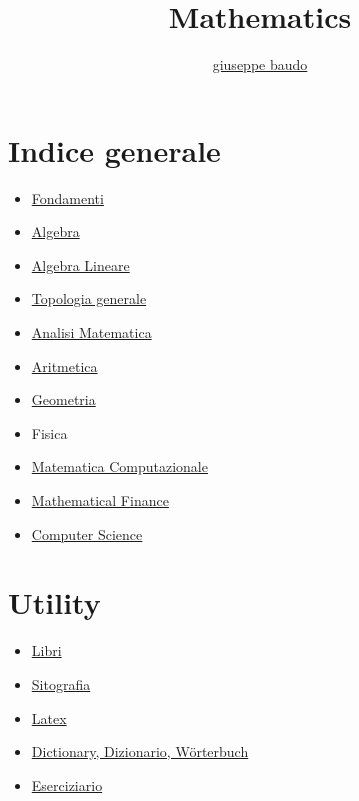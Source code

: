 \documentclass[a4paper,10pt]{article}
\title{Mathematics}
\author{\href{http://www.baudo.hol.es}{giuseppe baudo}}
\begin{document}
\maketitle

\section{Indice generale}
\begin{itemize}
  \item \href{Fondamenti.html}{Fondamenti}
  \item \href{Algebra.html}{Algebra}
  \item \href{AlgebraLineare.html}{Algebra Lineare}
  \item \href{TopologiaGenerale.html}{Topologia generale}
  \item \href{Analisi.html}{Analisi Matematica}
  \item \href{Aritmetica.html}{Aritmetica}  
  \item \href{Geometria.html}{Geometria}
  \item Fisica  
  \item \href{MatematicaComputazionale.html}{Matematica Computazionale}
  \item \href{Finance.html}{Mathematical Finance}  
  \item \href{Programming.html}{Computer Science}  
\end{itemize}

\section{Utility}
\begin{itemize}
  \item \href{Libri.html}{Libri}
  \item \href{Sitografia.html}{Sitografia}  
  \item \href{latex.html}{Latex} 
  \item \href{Dictionary.html}{Dictionary, Dizionario, W\"{o}rterbuch}
  \item \href{Eserciziario.html}{Eserciziario}  
\end{itemize}
\end{document}
